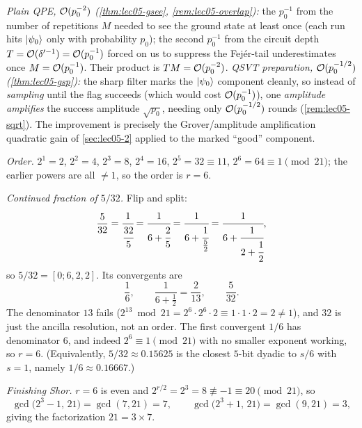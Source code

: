 \begin{solution}
\emph{Plain QPE, $\mathcal{O}(p_0^{-2})$ (\cref{thm:lec05-gsee}, \cref{rem:lec05-overlap}):}
the $p_0^{-1}$ from the number of repetitions $M$ needed to see the ground state
at least once (each run hits $\ket{\psi_0}$ only with probability $p_0$); the
second $p_0^{-1}$ from the circuit depth $T=\mathcal{O}(\delta'^{-1})=\mathcal{O}(p_0^{-1})$
forced on us to suppress the Fej\'er-tail underestimates once $M=\mathcal{O}(p_0^{-1})$.
Their product is $TM=\mathcal{O}(p_0^{-2})$.
\emph{QSVT preparation, $\mathcal{O}(p_0^{-1/2})$ (\cref{thm:lec05-gsp}):} the sharp
filter marks the $\ket{\psi_0}$ component cleanly, so instead of \emph{sampling}
until the flag succeeds (which would cost $\mathcal{O}(p_0^{-1})$), one \emph{amplitude
amplifies} the success amplitude $\sqrt{p_0}$, needing only $\mathcal{O}(p_0^{-1/2})$
rounds (\cref{rem:lec05-sqrt}). The improvement is precisely the Grover/amplitude
amplification quadratic gain of \cref{sec:lec05-2} applied to the marked ``good''
component.
\end{solution}

\begin{solution}
\emph{Order.} $2^{1}=2$, $2^{2}=4$, $2^{3}=8$, $2^{4}=16$, $2^{5}=32\equiv11$,
$2^{6}=64\equiv1\pmod{21}$; the earlier powers are all $\ne1$, so the order is
$r=6$.

\emph{Continued fraction of $5/32$.} Flip and split:
\[
  \frac{5}{32}=\cfrac{1}{\cfrac{32}{5}}
   =\cfrac{1}{6+\cfrac{2}{5}}
   =\cfrac{1}{6+\cfrac{1}{\tfrac{5}{2}}}
   =\cfrac{1}{6+\cfrac{1}{2+\cfrac{1}{2}}},
\]
so $5/32=[0;6,2,2]$. Its convergents are
\[
  \frac{1}{6},\qquad
  \frac{1}{6+\tfrac12}=\frac{2}{13},\qquad
  \frac{5}{32}.
\]
The denominator $13$ fails ($2^{13}\bmod21=2^{6}\cdot2^{6}\cdot2\equiv1\cdot1\cdot2=2\ne1$),
and $32$ is just the ancilla resolution, not an order. The first convergent
$1/6$ has denominator $6$, and indeed $2^{6}\equiv1\pmod{21}$ with no smaller
exponent working, so $r=6$. (Equivalently, $5/32\approx0.15625$ is the closest
$5$-bit dyadic to $s/6$ with $s=1$, namely $1/6\approx0.16667$.)

\emph{Finishing Shor.} $r=6$ is even and
$2^{r/2}=2^{3}=8\not\equiv-1\equiv20\pmod{21}$, so
\[
  \gcd\bigl(2^{3}-1,\,21\bigr)=\gcd(7,21)=7,\qquad
  \gcd\bigl(2^{3}+1,\,21\bigr)=\gcd(9,21)=3,
\]
giving the factorization $21=3\times7$.
\end{solution}


